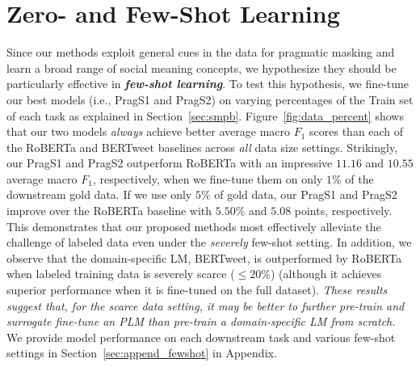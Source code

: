 \vspace{-3pt}
\section{Zero- and Few-Shot Learning}\label{sec:zfew}
Since our methods exploit general cues in the data for pragmatic masking and learn a broad range of social meaning concepts, we hypothesize they should be particularly effective in \textbf{\textit{few-shot learning}}. To test this hypothesis, we fine-tune our best models (i.e., PragS1 and PragS2) on varying percentages of the Train set of each task as explained in Section~\ref{sec:smpb}. Figure~\ref{fig:data_percent} shows that our two models \textit{always} achieve better average macro $F_1$ scores than each of the RoBERTa and BERTweet baselines across \textit{all} data size settings. Strikingly, our PragS1 and PragS2 outperform RoBERTa with an impressive $11.16$ and $10.55$ average macro $F_1$, respectively, when we fine-tune them on only $1\%$ of the downstream gold data. If we use only $5\%$ of gold data, our PragS1 and  PragS2 improve over the RoBERTa baseline with $5.50\%$ and $5.08$ points, respectively. This demonstrates that our proposed methods most effectively alleviate the challenge of labeled data even under the \textit{severely} few-shot setting. In addition, we observe that the domain-specific LM, BERTweet,  is outperformed by RoBERTa when labeled training data is severely scarce ($\leq 20\%$) (although it achieves superior performance when it is fine-tuned on the full dataset). \textit{These results suggest that, for the scarce data setting, it may be better to further pre-train and surrogate fine-tune an PLM than pre-train a domain-specific LM from scratch.}
We provide model performance on each downstream task and various few-shot settings in Section~\ref{sec:append_fewshot} in Appendix. 




